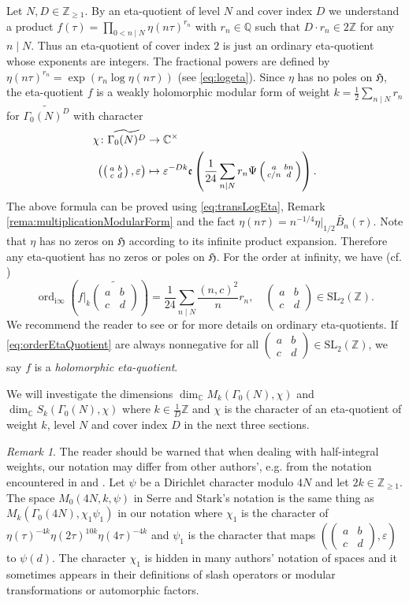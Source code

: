 \documentclass[12pt]{amsart}
\numberwithin{equation}{section}
\theoremstyle{plain}
\theoremstyle{definition}
\theoremstyle{remark}
\newtheorem{rema}[thm]{Remark}
\newcommand\rmi{\mathrm{i}}
\newcommand\tbtmat[4]{\left(\begin{smallmatrix}{#1} & {#2} \\ {#3} & {#4}\end{smallmatrix}\right)}
\newcommand\etp[1]{\mathfrak{e}\left(#1\right)}
\newcommand\ord{\mathop{\mathrm{ord}}}
\newcommand\numZ{\mathbb{Z}}
\newcommand\numQ{\mathbb{Q}}
\newcommand\numC{\mathbb{C}}
\newcommand\numgeq[2]{\mathbb{#1}_{\geq #2}}
\newcommand\slZ{\mathrm{SL}_2(\mathbb{Z})}
\newcommand\uhp{\mathfrak{H}}
\newcommand\elesltRaDs[5]{\left(\left(\begin{smallmatrix}{#1} & {#2} \\ {#3} & {#4}\end{smallmatrix}\right),{#5}\right)}
\newcommand\Dcover[2]{\widetilde{#1^{#2}}}
\begin{document}
Let $N,D\in\numgeq{Z}{1}$. By an eta-quotient of level $N$ and cover index $D$ we understand a product $f(\tau)=\prod_{0<n\mid N}\eta(n\tau)^{r_n}$ with $r_n\in\numQ$ such that $D\cdot r_n\in2\numZ$ for any $n\mid N$. Thus an eta-quotient of cover index $2$ is just an ordinary eta-quotient whose exponents are integers. The fractional powers are defined by $\eta(n\tau)^{r_n}=\exp\left(r_n\log\eta(n\tau)\right)$ (see \eqref{eq:logeta}). Since $\eta$ has no poles on $\uhp$, the eta-quotient $f$ is a weakly holomorphic modular form of weight $k=\frac{1}{2}\sum_{n\mid N}r_n$ for $\Dcover{\Gamma_0(N)}{D}$ with character
\begin{align}
\chi\colon\Dcover{\Gamma_0(N)}{D} &\rightarrow\numC^\times \label{eq:charEtaQuotient}\\
\elesltRaDs{a}{b}{c}{d}{\varepsilon} &\mapsto \varepsilon^{-Dk}\etp{\frac{1}{24}\sum_{n \mid N}r_n\Psi\tbtmat{a}{bn}{c/n}{d}}.\notag
\end{align}
The above formula can be proved using \eqref{eq:transLogEta}, Remark \ref{rema:multiplicationModularForm} and the fact $\eta(n\tau)=n^{-1/4}\eta\vert_{1/2}\widetilde{B_n}(\tau)$. Note that $\eta$ has no zeros on $\uhp$ according to its infinite product expansion. Therefore any eta-quotient has no zeros or poles on $\uhp$. For the order at infinity, we have (cf. \cite[Lemma 4.2]{Zhu23})
\begin{equation}
\label{eq:orderEtaQuotient}
\ord\nolimits_{\rmi\infty}(f\vert_k\widetilde{\tbtmat{a}{b}{c}{d}})=\frac{1}{24}\sum_{n \mid N}\frac{(n,c)^2}{n}r_n,\quad\tbtmat{a}{b}{c}{d}\in\slZ.
\end{equation}
We recommend the reader to see \cite[Section 2]{Bha21} or \cite[Section 5]{Bha17} for more details on ordinary eta-quotients. If \eqref{eq:orderEtaQuotient} are always nonnegative for all $\tbtmat{a}{b}{c}{d}\in\slZ$, we say $f$ is a \emph{holomorphic eta-quotient}.

We will investigate the dimensions $\dim_\numC M_k(\Gamma_0(N),\chi)$ and $\dim_\numC S_k(\Gamma_0(N),\chi)$ where $k\in\frac{1}{D}\numZ$ and $\chi$ is the character of an eta-quotient of weight $k$, level $N$ and cover index $D$ in the next three sections.

\begin{rema}
The reader should be warned that when dealing with half-integral weights, our notation may differ from other authors', e.g. from the notation encountered in \cite{Shi73} and \cite{SS77}. Let $\psi$ be a Dirichlet character modulo $4N$ and let $2k\in\numgeq{Z}{1}$. The space $M_{0}(4N, k, \psi)$ in Serre and Stark's notation is the same thing as $M_{k}(\Gamma_0(4N), \chi_1\psi_1)$ in our notation where $\chi_1$ is the character of $\eta(\tau)^{-4k}\eta(2\tau)^{10k}\eta(4\tau)^{-4k}$ and $\psi_1$ is the character that maps $\elesltRaDs{a}{b}{c}{d}{\varepsilon}$ to $\psi(d)$. The character $\chi_1$ is hidden in many authors' notation of spaces and it sometimes appears in their definitions of slash operators or modular transformations or automorphic factors.
\end{rema}
\end{document}
